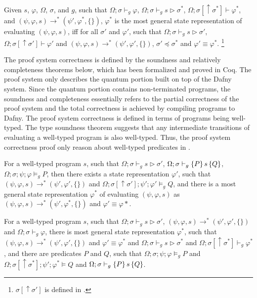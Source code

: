 \begin{definition}\label{def:most-gen}\rm 
  Given $s$, $\varphi$, $\Omega$, $\sigma$, and $g$, such that $\Omega;\sigma\vdash_g \varphi$, $\Omega;\sigma\vdash_g s \triangleright \sigma^*$, $\Omega;\sigma[\uparrow \sigma^*]\vdash \varphi^*$, and $(\psi,\varphi,s) \longrightarrow^{*} (\psi',\varphi^*,\{\})$, $\varphi^*$ is the most general state representation of evaluating $(\psi,\varphi,s)$, iff for all $\sigma'$ and $\varphi'$, such that $\Omega;\sigma\vdash_g s \triangleright \sigma'$, $\Omega;\sigma[\uparrow \sigma']\vdash \varphi'$ and $(\psi,\varphi,s) \longrightarrow^{*} (\psi',\varphi',\{\})$, $\sigma' \preceq \sigma^*$ and $\varphi' \equiv \varphi^*$. \footnote{$\sigma[\uparrow \sigma']$ is defined in .}
\end{definition}

The \qafny proof system correctness is defined by the soundness and relatively completeness theorems below, which has been formalized and proved in Coq. The \qafny proof system only describes the quantum portion built on top of the Dafny system. Since the quantum portion contains non-terminated programs, the soundness and completeness essentially refers to the partial correctness of the \qafny proof system and the total correctness is achieved by compiling \qafny programs to Dafny. The \qafny proof system correctness is defined in terms of programs being well-typed. The type soundness theorem suggests that any intermediate transitions of evaluating a well-typed \qafny program is also well-typed. Thus, the proof system correctness proof only reason about well-typed predicates in .


\begin{theorem}\label{thm:proof-soundness}\rm 
For a well-typed program $s$, such that $\Omega;\sigma\vdash_g s \triangleright \sigma'$, $\Omega;\sigma\vdash_{g}\{P\}\, s \,\{Q\}$, $\Omega;\sigma;\psi;\varphi\models_g P$, then there exists a state representation $\varphi'$, such that $(\psi,\varphi,s)\longrightarrow^* (\psi',\varphi',\{\})$ and $\Omega;\sigma[\uparrow\sigma'];\psi';\varphi'\models_g Q$, and there is a most general state representation $\varphi^*$ of evaluating $(\psi,\varphi,s)$ as $(\psi,\varphi,s)\longrightarrow^* (\psi',\varphi^*,\{\})$ and $\varphi' \equiv \varphi*$.
\end{theorem}

\begin{theorem}\label{thm:proof-completeness}\rm 
For a well-typed program $s$, such that $\Omega;\sigma\vdash_g s \triangleright \sigma'$, $(\psi,\varphi,s)\longrightarrow^* (\psi',\varphi',\{\})$ and $\Omega;\sigma\vdash_g \varphi$, there is most general state representation $\varphi^*$, such that $(\psi,\varphi,s)\longrightarrow^* (\psi',\varphi',\{\})$ and $\varphi' \equiv \varphi^*$ and $\Omega;\sigma\vdash_g s \triangleright \sigma^*$ and $\Omega;\sigma[\uparrow \sigma^*]\vdash_g \varphi^*$, and there are predicates $P$ and $Q$, such that $\Omega;\sigma;\psi;\varphi\models_g P$ and $\Omega;\sigma[\uparrow\sigma^*];\psi';\varphi^* \models Q$ and $\Omega;\sigma\vdash_{g}\{P\}\, s \,\{Q\}$.
\end{theorem}





